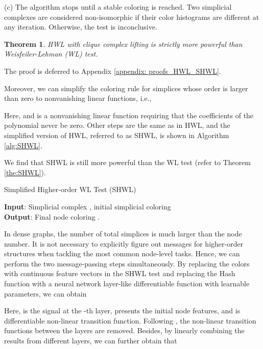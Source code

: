 \documentclass[letterpaper]{article} \usepackage{aaai24}
\theoremstyle{plain}
\newtheorem{theorem}{Theorem}[section]
\theoremstyle{definition}
\theoremstyle{remark}
\begin{document}
(c) The algorithm stops until a stable coloring is reached. Two simplicial complexes are considered non-isomorphic if their color histograms are different at any iteration. Otherwise, the test is inconclusive.

\begin{theorem}
\label{the:HWL}
HWL with clique complex lifting is strictly more powerful than Weisfeiler-Lehman (WL) test.
\end{theorem}

The proof is deferred to Appendix \ref{appendix: proofs_HWL_SHWL}.

Moreover, we can simplify the coloring rule for simplices whose order is larger than zero to nonvanishing linear functions, i.e.,

Here,  and  is a nonvanishing linear function requiring that the coefficients of the polynomial never be zero. Other steps are the same as in HWL, and the simplified version of HWL, referred to as SHWL, is shown in Algorithm \ref{alg:SHWL}.


We find that SHWL is still more powerful than the WL test (refer to Theorem \ref{the:SHWL}). 


\begin{algorithm}[htp] 
\caption{Simplified Higher-order WL Test (SHWL)}
\textbf{Input}: Simplicial complex , initial simplicial coloring  \\
\textbf{Output}: Final node coloring .
\vspace{-1em} \begin{algorithmic}[1]\STATE  
\REPEAT
    \STATE  \ENDFOR
    \STATE  \ENDFOR
    \STATE 
{}
\end{algorithmic}
\label{alg:SHWL}
\end{algorithm}






In dense graphs, the number of total simplices is much larger than the node number. It is not necessary to explicitly figure out messages for higher-order structures when tackling the most common node-level tasks. 
Hence, we can perform the two message-passing steps simultaneously. By replacing the colors with continuous feature vectors in the SHWL test and replacing the Hash function with a neural network layer-like differentiable function with learnable parameters, we can obtain 

Here,  is the signal at the -th layer,  presents the initial node features, and  is differentiable non-linear transition function. Following \cite{SGC}, the non-linear transition functions between the layers are removed.
Besides, by linearly combining the results from different layers, we can further obtain that 
\end{document}
